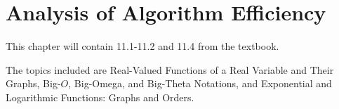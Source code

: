 \documentclass[../discrete.tex]{subfiles}
\begin{document}
\chapter{Analysis of Algorithm Efficiency}
This chapter will contain 11.1-11.2 and 11.4 from the textbook.

The topics included are Real-Valued Functions of a Real Variable and Their Graphs, Big-$O$, Big-Omega, and Big-Theta Notations, and Exponential and Logarithmic Functions: Graphs and Orders.
\end{document}
